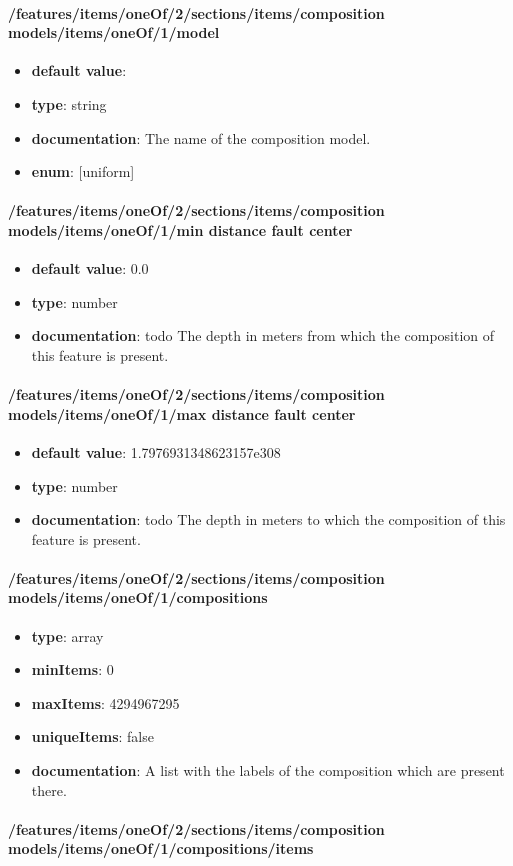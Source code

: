 \paragraph{/features/items/oneOf/2/sections/items/composition models/items/oneOf/1/model}
\begin{itemize}\item {\bf default value}: 
\item {\bf type}: string
\item {\bf documentation}: The name of the composition model.
\item {\bf enum}: [uniform]\end{itemize}\paragraph{/features/items/oneOf/2/sections/items/composition models/items/oneOf/1/min distance fault center}
\begin{itemize}\item {\bf default value}: 0.0
\item {\bf type}: number
\item {\bf documentation}: todo The depth in meters from which the composition of this feature is present.
\end{itemize}\paragraph{/features/items/oneOf/2/sections/items/composition models/items/oneOf/1/max distance fault center}
\begin{itemize}\item {\bf default value}: 1.7976931348623157e308
\item {\bf type}: number
\item {\bf documentation}: todo The depth in meters to which the composition of this feature is present.
\end{itemize}\paragraph{/features/items/oneOf/2/sections/items/composition models/items/oneOf/1/compositions}
\begin{itemize}\item {\bf type}: array
\item {\bf minItems}: 0
\item {\bf maxItems}: 4294967295
\item {\bf uniqueItems}: false
\item {\bf documentation}: A list with the labels of the composition which are present there.
\end{itemize}\paragraph{/features/items/oneOf/2/sections/items/composition models/items/oneOf/1/compositions/items}
